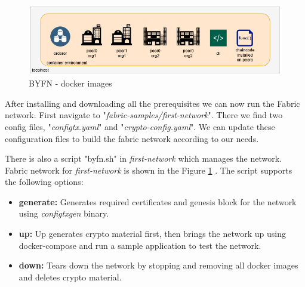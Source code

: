 \begin{figure}[!h]
    \centering
    \includegraphics[scale=0.55]{images/byfn.png}
    \caption{BYFN - docker images\cite{medium_byfn}}
    \label{fig:fabric_network}
\end{figure}

After installing and downloading all the prerequisites we can now run the Fabric network. First navigate to "\textit{fabric-samples/first-network}".
There we  find two config files, "\textit{configtx.yaml}" and "\textit{crypto-config.yaml}". We can update these configuration files to build the fabric network according to our needs.



There is also a script "byfn.sh" in \textit{first-network} which manages the network. Fabric network for \textit{first-network} is shown in the Figure \ref{fig:fabric_network} . The script supports the following options:
\begin{itemize}
    \item \textbf{generate: } Generates required certificates and genesis block for the network using  \textit{configtxgen} binary.
    \item \textbf{up: } Up generates crypto material first, then brings the network up using docker-compose and run a sample application to test the network.
     \item \textbf{down: } Tears down the network by stopping and removing all docker images and deletes  crypto material.
    
\end{itemize}